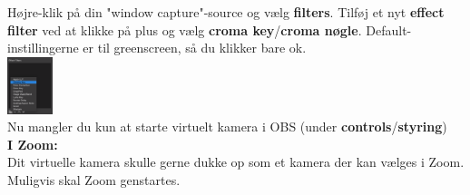 \documentclass{ucph-handout}
\begin{document}
\begin{exercisebox}[adjusted title= Klargør koden i p5.js - mac optimering]

Højre-klik på din "window capture"-source og vælg \textbf{filters}. Tilføj et nyt \textbf{effect filter} ved at klikke på plus og vælg \textbf{croma key}/\textbf{croma nøgle}. Default-instillingerne er til greenscreen, så du klikker bare ok.\\

\includegraphics[width=0.1\textwidth]{billeder/cromakey.png}\\

Nu mangler du kun at starte virtuelt kamera i OBS (under \textbf{controls}/\textbf{styring}) \\

\textbf{I Zoom:}\\
Dit virtuelle kamera skulle gerne dukke op som et kamera der kan vælges i Zoom. Muligvis skal Zoom genstartes.

\end{exercisebox}
\end{document}
